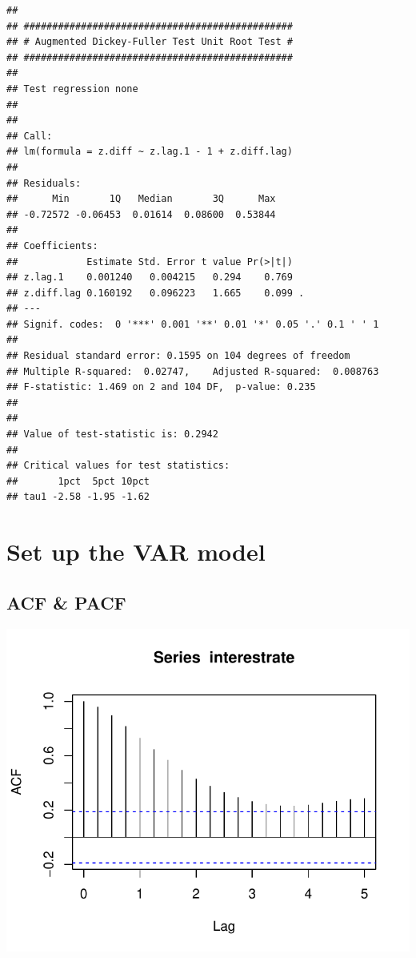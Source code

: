 \documentclass[11pt,preprint, authoryear]{elsarticle}
\numberwithin{equation}{section}
\numberwithin{figure}{section}
\numberwithin{table}{section}
\begin{document}
\begin{verbatim}
## 
## ############################################### 
## # Augmented Dickey-Fuller Test Unit Root Test # 
## ############################################### 
## 
## Test regression none 
## 
## 
## Call:
## lm(formula = z.diff ~ z.lag.1 - 1 + z.diff.lag)
## 
## Residuals:
##      Min       1Q   Median       3Q      Max 
## -0.72572 -0.06453  0.01614  0.08600  0.53844 
## 
## Coefficients:
##            Estimate Std. Error t value Pr(>|t|)  
## z.lag.1    0.001240   0.004215   0.294    0.769  
## z.diff.lag 0.160192   0.096223   1.665    0.099 .
## ---
## Signif. codes:  0 '***' 0.001 '**' 0.01 '*' 0.05 '.' 0.1 ' ' 1
## 
## Residual standard error: 0.1595 on 104 degrees of freedom
## Multiple R-squared:  0.02747,    Adjusted R-squared:  0.008763 
## F-statistic: 1.469 on 2 and 104 DF,  p-value: 0.235
## 
## 
## Value of test-statistic is: 0.2942 
## 
## Critical values for test statistics: 
##       1pct  5pct 10pct
## tau1 -2.58 -1.95 -1.62
\end{verbatim}

\hypertarget{set-up-the-var-model}{%
\section{Set up the VAR model}\label{set-up-the-var-model}}

\hypertarget{acf-pacf}{%
\subsection{ACF \& PACF}\label{acf-pacf}}

\begin{center}\includegraphics{README_files/figure-latex/unnamed-chunk-29-1} \end{center}
\end{document}
